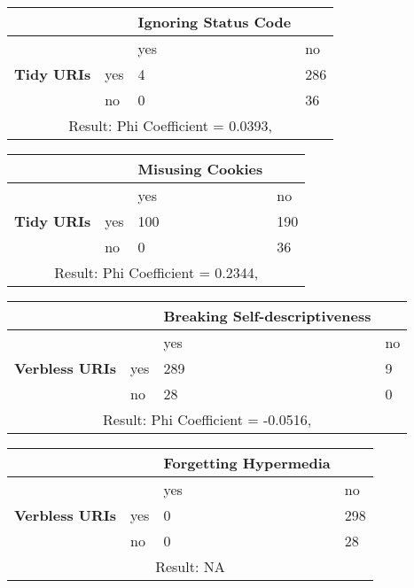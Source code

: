 \documentclass[a4paper,12pt]{article}
\begin{document}
\begin{center}
  \begin{tabular}{| p{60mm} | p{10mm} | p{35mm} | p{35mm} |}
  \hline
   & & \textbf{Ignoring Status Code} &
  \\
  \hline
  & & yes & no
  \\
  \hline
  \textbf{Tidy URIs} & yes & 4 & 286
  \\
  \hline
   & no & 0 & 36
  \\
  \hline
  \multicolumn{4}{|c|}{Result: Phi Coefficient = 0.0393, }
  \\ \hline
  \end{tabular}
  \end{center}

\begin{center}
  \begin{tabular}{| p{60mm} | p{10mm} | p{35mm} | p{35mm} |}
  \hline
   & & \textbf{Misusing Cookies} &
  \\
  \hline
  & & yes & no
  \\
  \hline
  \textbf{Tidy URIs} & yes & 100 & 190
  \\
  \hline
   & no & 0 & 36
  \\
  \hline
  \multicolumn{4}{|c|}{Result: Phi Coefficient = 0.2344, }
  \\ \hline
  \end{tabular}
  \end{center}

\begin{center}
  \begin{tabular}{| p{60mm} | p{10mm} | p{35mm} | p{35mm} |}
  \hline
   & & \textbf{Breaking Self-descriptiveness} &
  \\
  \hline
  & & yes & no
  \\
  \hline
  \textbf{Verbless URIs} & yes & 289 & 9
  \\
  \hline
   & no & 28 & 0
  \\
  \hline
  \multicolumn{4}{|c|}{Result: Phi Coefficient = -0.0516, }
  \\ \hline
  \end{tabular}
  \end{center}

\begin{center}
  \begin{tabular}{| p{60mm} | p{10mm} | p{35mm} | p{35mm} |}
  \hline
   & & \textbf{Forgetting Hypermedia} &
  \\
  \hline
  & & yes & no
  \\
  \hline
  \textbf{Verbless URIs} & yes & 0 & 298
  \\
  \hline
   & no & 0 & 28
  \\
  \hline
  \multicolumn{4}{|c|}{Result: NA}
  \\ \hline
  \end{tabular}
  \end{center}
\end{document}
